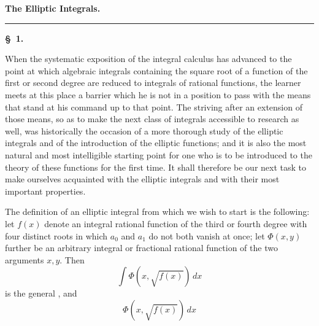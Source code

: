 
\begin{center}
\end{center}

\begin{center}
\textbf{The Elliptic Integrals.}
\end{center}

\begin{center}
\rule{3cm}{0.4pt}
\end{center}

\begin{center}
\textbf{\S\ 1. }
\end{center}

When the systematic exposition of the integral calculus has advanced to the point at which algebraic integrals containing the square root of a function of the first or second degree are reduced to integrals of rational functions, the learner meets at this place a barrier which he is not in a position to pass with the means that stand at his command up to that point. The striving after an extension of those means, so as to make the next class of integrals accessible to research as well, was historically the occasion of a more thorough study of the elliptic integrals and of the introduction of the elliptic functions; and it is also the most natural and most intelligible starting point for one who is to be introduced to the theory of these functions for the first time. It shall therefore be our next task to make ourselves acquainted with the elliptic integrals and with their most important properties.

The definition of an elliptic integral from which we wish to start is the following: let $f(x)$ denote an integral rational function of the third or fourth degree with four distinct roots
in which $a_0$ and $a_1$ do not both vanish at once; let $\Phi(x, y)$ further be an arbitrary integral or fractional rational function of the two arguments $x, y$. Then
\[
\int \Phi(x, \sqrt{f(x)})\, dx
\]
is the general , and
\[
\Phi(x, \sqrt{f(x)})\, dx
\]
